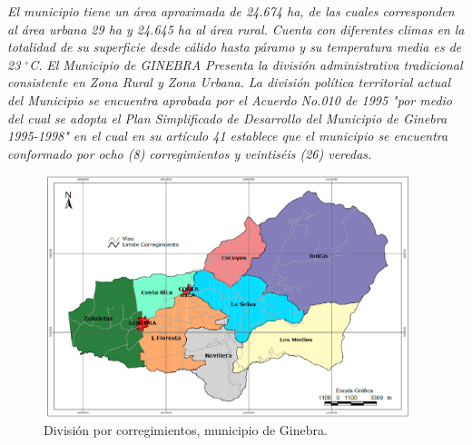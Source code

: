 \documentclass[12pt,letterpaper,openany]{book}
\newcommand{\grad}{$^{\circ}$}
\begin{document}
\textit{El municipio tiene un área aproximada de 24.674 ha, de las cuales corresponden al área urbana 29 ha y 24.645 ha al área rural. Cuenta con diferentes climas en la totalidad de su superficie desde cálido hasta páramo y su temperatura media es de 23 \grad C.}
\vspace{5mm}\newline
\textit{El Municipio de GINEBRA Presenta la división administrativa tradicional consistente en Zona Rural y Zona Urbana.}
\vspace{5mm}\newline	
\textit{La división política territorial actual del Municipio se encuentra aprobada por el Acuerdo No.010 de 1995 "por medio del cual se adopta el Plan Simplificado de Desarrollo del Municipio de Ginebra 1995-1998" en el cual en su artículo 41 establece que el municipio se encuentra conformado por ocho (8) corregimientos y veintiséis (26) veredas.}

\begin{figure}[H]
\begin{center}
\includegraphics[width=10.7cm]{./imagenes/division_corregimientos}
\caption{División por corregimientos, municipio de Ginebra.}
\end{center}
\end{figure}
\end{document}
